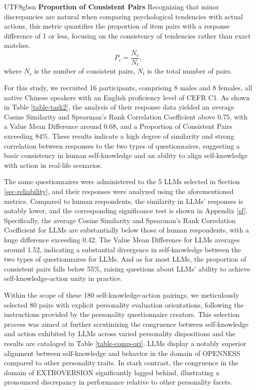 \documentclass{article}
\theoremstyle{plain}
\theoremstyle{definition}
\theoremstyle{remark}
\begin{document}
\begin{CJK*}{UTF8}{gbsn}
\textbf{Proportion of Consistent Pairs} \quad Recognizing that minor discrepancies are natural when comparing psychological tendencies with actual actions, this metric quantifies the proportion of item pairs with a response difference of 1 or less, focusing on the consistency of tendencies rather than exact matches.
\begin{equation}
    P_c = \frac{N_c}{N_t},
\end{equation}
where $N_c$ is the number of consistent pairs, $N_t$ is the total number of pairs.

For this study, we recruited 16 participants, comprising 8 males and 8 females, all native Chinese speakers with an English proficiency level of CEFR C1. As shown in Table \ref{table-task2}, the analysis of their response data yielded an average Cosine Similarity and Spearman's Rank Correlation Coefficient above 0.75, with a Value Mean Difference around 0.68, and a Proportion of Consistent Pairs exceeding $84\%$. These results indicate a high degree of similarity and strong correlation between responses to the two types of questionnaires, suggesting a basic consistency in human self-knowledge and an ability to align self-knowledge with action in real-life scenarios.

The same questionnaires were administered to the 5 LLMs selected in Section \ref{sec-reliability}, and their responses were analyzed using the aforementioned metrics. Compared to human respondents, the similarity in LLMs' responses is notably lower, and the corresponding significance test is shown in Appendix \ref{sf}. Specifically, the average Cosine Similarity and Spearman's Rank Correlation Coefficient for LLMs are substantially below those of human respondents, with a huge difference exceeding 0.42. The Value Mean Difference for LLMs averages around 1.52, indicating a substantial divergence in self-knowledge between the two types of questionnaires for LLMs. And as for most LLMs, the proportion of consistent pairs falls below 55$\%$, raising questions about LLMs' ability to achieve self-knowledge-action unity in practice.


\iffalse
Within the scope of these 180 self-knowledge-action pairings, we meticulously selected 80 pairs with explicit personality evaluation orientations, following the instructions provided by the personality questionnaire creators. This selection process was aimed at further scrutinizing the congruence between self-knowledge and action exhibited by LLMs across varied personality dispositions and the results are cataloged in Table \ref{table-comp-ori}. LLMs display a notably superior alignment between self-knowledge and behavior in the domain of OPENNESS compared to other personality traits. In stark contrast, the congruence in the domain of EXTROVERSION significantly lagged behind, illustrating a pronounced discrepancy in performance relative to other personality facets.


\end{CJK*}
\end{document}
